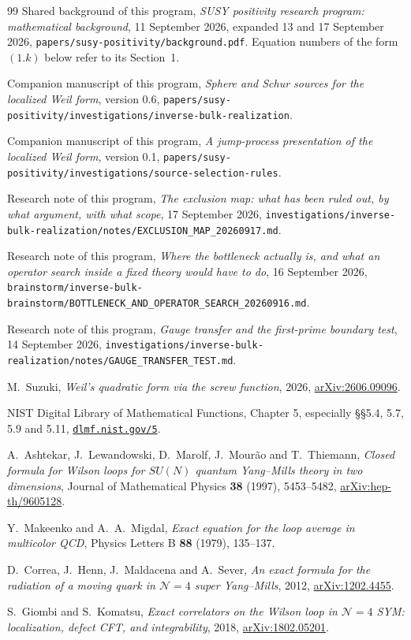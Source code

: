 \begin{thebibliography}{99}
Shared background of this program, \emph{SUSY positivity research program:
mathematical background}, 11 September 2026, expanded 13 and 17 September 2026,
\texttt{papers/susy-positivity/background.pdf}. Equation numbers of the form
$(1.k)$ below refer to its Section~1.

Companion manuscript of this program, \emph{Sphere and Schur sources for the
localized Weil form}, version 0.6,
\texttt{papers/susy-positivity/investigations/inverse-bulk-realization}.

Companion manuscript of this program, \emph{A jump-process presentation of the
localized Weil form}, version 0.1,
\texttt{papers/susy-positivity/investigations/source-selection-rules}.

Research note of this program, \emph{The exclusion map: what has been ruled out,
by what argument, with what scope}, 17 September 2026,
\texttt{investigations/inverse-bulk-realization/notes/EXCLUSION\_MAP\_20260917.md}.

Research note of this program, \emph{Where the bottleneck actually is, and what
an operator search inside a fixed theory would have to do}, 16 September 2026,
\texttt{brainstorm/inverse-bulk-brainstorm/BOTTLENECK\_AND\_OPERATOR\_SEARCH\_20260916.md}.

Research note of this program, \emph{Gauge transfer and the first-prime boundary
test}, 14 September 2026,
\texttt{investigations/inverse-bulk-realization/notes/GAUGE\_TRANSFER\_TEST.md}.

M.~Suzuki, \emph{Weil's quadratic form via the screw function}, 2026,
\href{https://arxiv.org/abs/2606.09096}{arXiv:2606.09096}.

NIST Digital Library of Mathematical Functions, Chapter 5,
especially \S\S5.4, 5.7, 5.9 and 5.11,
\href{https://dlmf.nist.gov/5}{\texttt{dlmf.nist.gov/5}}.

A.~Ashtekar, J.~Lewandowski, D.~Marolf, J.~Mour\~ao and T.~Thiemann,
\emph{Closed formula for Wilson loops for $SU(N)$ quantum Yang--Mills theory in
two dimensions}, Journal of Mathematical Physics \textbf{38} (1997), 5453--5482,
\href{https://arxiv.org/abs/hep-th/9605128}{arXiv:hep-th/9605128}.

Y.~Makeenko and A.~A.~Migdal, \emph{Exact equation for the loop average in
multicolor QCD}, Physics Letters B \textbf{88} (1979), 135--137.

D.~Correa, J.~Henn, J.~Maldacena and A.~Sever, \emph{An exact formula for the
radiation of a moving quark in $\mathcal N=4$ super Yang--Mills}, 2012,
\href{https://arxiv.org/abs/1202.4455}{arXiv:1202.4455}.

S.~Giombi and S.~Komatsu, \emph{Exact correlators on the Wilson loop in
$\mathcal N=4$ SYM: localization, defect CFT, and integrability}, 2018,
\href{https://arxiv.org/abs/1802.05201}{arXiv:1802.05201}.
\end{thebibliography}
